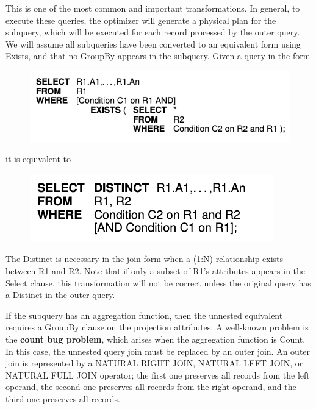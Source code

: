 This is one of the most common and important transformations. In general, to execute these queries, the optimizer will generate a physical plan for the subquery, which will be executed for each record processed by the outer query. We will assume all subqueries  have been converted to an equivalent form using Exists, and that no GroupBy appears in the subquery. Given a query in the form
\begin{figure}[H]
    \centering
    \includegraphics[width=0.75\linewidth]{img/opt_query1.png}   
\end{figure}
\noindent it is equivalent to
\begin{figure}[H]
    \centering
    \includegraphics[width=0.5\linewidth]{img/opt_query2.png}
\end{figure}
The Distinct is necessary in the join form when a (1:N) relationship exists between R1 and R2. Note that if only a subset of R1's attributes appears in the Select clause, this transformation will not be correct unless the original query has a Distinct in the outer query.

If the subquery has an aggregation function, then the unnested equivalent requires a GroupBy clause on the projection attributes. A well-known problem is the \textbf{count bug problem}, which arises when the aggregation function is Count. In this case, the unnested query join must be replaced by an outer join.
An outer join is represented by a NATURAL RIGHT JOIN, NATURAL LEFT JOIN, or NATURAL FULL JOIN operator; the first one preserves all records from the left operand, the second one preserves all records from the right operand, and the third one preserves all records.


